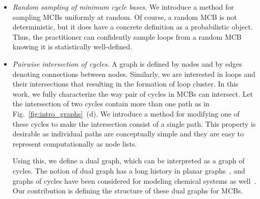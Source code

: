 \documentclass[fleqn,11pt]{article}
\newcommand\calM{\mathcal{M}}
\begin{document}

\begin{itemize}
	\item \emph{Random sampling of minimum cycle bases.} We introduce a method for sampling MCBs uniformly at random. %
	Of course, a random MCB is not deterministic, but it does have a concrete definition as a probabilistic object. 
	Thus, the practitioner can confidently sample loops from a random MCB knowing it is statistically well-defined.
	\item \emph{Pairwise intersection of cycles.} 
	A graph is defined by nodes and by edges denoting connections between nodes. 
	Similarly, we are interested in loops and their intersections that resulting in the formation of loop cluster. 
	In this work, we fully characterize the way pair of cycles in MCBs can intersect. 
	Let the intersection of two cycles contain more than one path as in Fig.~\ref{fig:intro_graphs}~(d). 
	We introduce a method for modifying one of these cycles to make the intersection consist of a single path. 
	This property is desirable as individual paths are conceptually simple and they are easy to represent computationally as node lists.
	
	Using this, we define a dual graph, which can be interpreted as a graph of cycles. The notion of dual graph has a long history in planar graphs~\cite{diestelGraph2017}, and graphs of cycles have been considered for modeling chemical systems as well~\cite{torres-knoopModeling2018,nouleho2019improving}. Our contribution is defining the structure of these dual graphs for MCBs.
\end{itemize}
\end{document}
